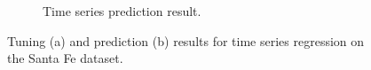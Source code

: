 \documentclass{article}
\begin{document}
\begin{figure}[h]
\begin{subfigure}[b]{0.4\textwidth}
                 \caption{Time series prediction result.}
                 \label{fig:santafe_prediction}
             \end{subfigure}
             \hspace{0.05\textwidth}
            \caption{Tuning (a) and prediction (b) results for time series regression on the Santa Fe dataset.}
        \end{figure}
        
    
\end{document}
